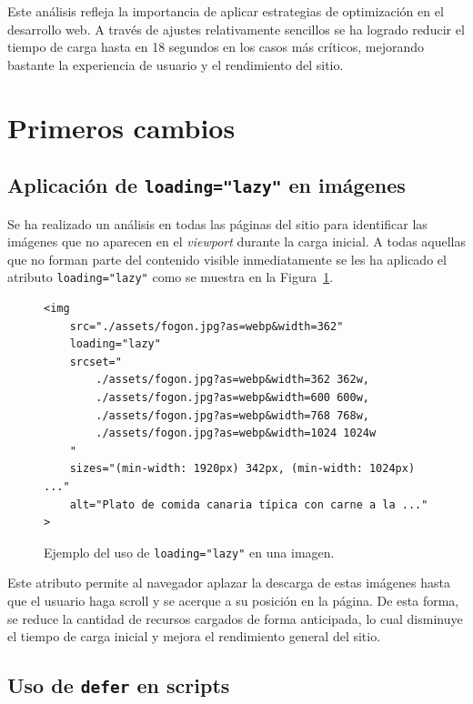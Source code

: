 \documentclass{article}
\begin{document}
Este análisis refleja la importancia de aplicar estrategias de optimización en el desarrollo web. A través de ajustes relativamente sencillos se ha logrado reducir el tiempo de carga hasta en 18 segundos en los casos más críticos, mejorando bastante la experiencia de usuario y el rendimiento del sitio.

\section{Primeros cambios}\label{sec:primeros-cambios}

\subsection{Aplicación de \texttt{loading="lazy"} en imágenes}\label{subsec:loading-lazy}

Se ha realizado un análisis en todas las páginas del sitio para identificar las imágenes que no aparecen en el \textit{viewport} durante la carga inicial. A todas aquellas que no forman parte del contenido visible inmediatamente se les ha aplicado el atributo \texttt{loading="lazy"} como se muestra en la Figura~\ref{fig:loading-lazy}.

\begin{figure}[h!]
\begin{verbatim}
<img
    src="./assets/fogon.jpg?as=webp&width=362"
    loading="lazy"
    srcset="
        ./assets/fogon.jpg?as=webp&width=362 362w,
        ./assets/fogon.jpg?as=webp&width=600 600w,
        ./assets/fogon.jpg?as=webp&width=768 768w,
        ./assets/fogon.jpg?as=webp&width=1024 1024w
    "
    sizes="(min-width: 1920px) 342px, (min-width: 1024px) ..."
    alt="Plato de comida canaria típica con carne a la ..."
>
\end{verbatim}
\caption{Ejemplo del uso de \texttt{loading="lazy"} en una imagen.}
\label{fig:loading-lazy}
\end{figure}

Este atributo permite al navegador aplazar la descarga de estas imágenes hasta que el usuario haga scroll y se acerque a su posición en la página. De esta forma, se reduce la cantidad de recursos cargados de forma anticipada, lo cual disminuye el tiempo de carga inicial y mejora el rendimiento general del sitio.

\subsection{Uso de \texttt{defer} en scripts}\label{subsec:defer-en-scripts}
\end{document}

